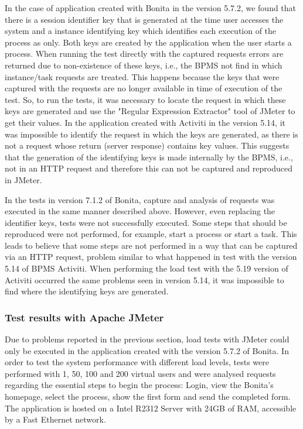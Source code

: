 \documentclass[runningheads,a4paper]{llncs}
\begin{document}
In the case of application created with Bonita in the version 5.7.2, we found that there is a session identifier key that is generated at the time user accesses the system and a instance identifying key which identifies each execution of the process as only. Both keys are created by the application when the user starts a process. When running the test directly with the captured requests errors are returned due to non-existence of these keys, i.e., the BPMS not find in which instance/task requests are treated. This happens because the keys that were captured with the requests are no longer available in time of execution of the test. So, to run the tests, it was necessary to locate the request in which these keys are generated and use the "Regular Expression Extractor" tool of JMeter to get their values. In the application created with Activiti in the version 5.14, it was impossible to identify the request in which the keys are generated, as there is not a request whose return (server response) contains key values. This suggests that the generation of the identifying keys is made internally by the BPMS, i.e.,  not in an HTTP request and therefore this can not be captured and reproduced in JMeter.

In the tests in version 7.1.2 of Bonita, capture and analysis of requests was executed in the same manner described above. However, even replacing the identifier keys, tests were not successfully executed. Some steps that should be reproduced were not performed, for example, start a process or start a task. This leads to believe that some steps are not performed in a way that can be captured via an HTTP request, problem similar to what happened in test with the version 5.14 of BPMS Activiti. When performing the load test with the 5.19 version of Activiti occurred the same problems seen in version 5.14, it was impossible to find where the identifying keys are generated.

\subsubsection{Test results with Apache JMeter}

Due to problems reported in the previous section, load tests with JMeter could only be executed in the application created with the version 5.7.2 of Bonita. In order to test the system performance with different load levels, tests were performed with 1, 50, 100 and 200 virtual users and were analysed requests regarding the essential steps to begin the process: Login, view the Bonita's homepage, select the process, show the first form and send the completed form. The application is hosted on a Intel R2312 Server with 24GB of RAM, accessible by a Fast Ethernet network.
\end{document}
